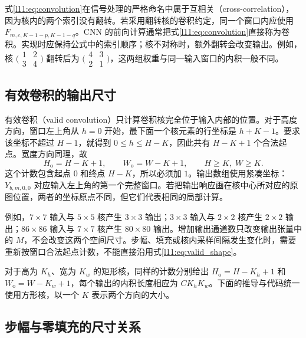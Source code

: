 式\eqref{l11:eq:convolution}在信号处理的严格命名中属于互相关（cross-correlation），因为核内的两个索引没有翻转。若采用翻转核的卷积约定，同一个窗口内应使用 $F_{m,c,K-1-p,K-1-q}$。CNN 的前向计算通常把式\eqref{l11:eq:convolution}直接称为卷积。实现时应保持公式中的索引顺序；核不对称时，额外翻转会改变输出。例如，核 $\bigl(\begin{smallmatrix}1&2\\3&4\end{smallmatrix}\bigr)$ 翻转后为 $\bigl(\begin{smallmatrix}4&3\\2&1\end{smallmatrix}\bigr)$，这两组权重与同一输入窗口的内积一般不同。

\subsection{有效卷积的输出尺寸}

有效卷积（valid convolution）只计算卷积核完全位于输入内部的位置。对于高度方向，窗口左上角从 $h=0$ 开始，最下面一个核元素的行坐标是 $h+K-1$。要求该坐标不超过 $H-1$，就得到 $0\le h\le H-K$，因此共有 $H-K+1$ 个合法起点。宽度方向同理，故
\begin{equation}
  H_{\mathrm{o}}=H-K+1,\qquad W_{\mathrm{o}}=W-K+1,
  \qquad H\ge K,\;W\ge K.
  \label{l11:eq:valid_shape}
\end{equation}
这个计数包含起点 $0$ 和终点 $H-K$，所以必须加 $1$。输出数组使用紧凑坐标：$Y_{b,m,0,0}$ 对应输入左上角的第一个完整窗口。若把输出响应画在核中心所对应的原图位置，两者的坐标原点不同，但它们代表相同的局部计算。

例如，$7\times7$ 输入与 $5\times5$ 核产生 $3\times3$ 输出；$3\times3$ 输入与 $2\times2$ 核产生 $2\times2$ 输出；$86\times86$ 输入与 $7\times7$ 核产生 $80\times80$ 输出。增加输出通道数只改变输出张量中的 $M$，不会改变这两个空间尺寸。步幅、填充或核内采样间隔发生变化时，需要重新按窗口合法起点计数，不能直接沿用式\eqref{l11:eq:valid_shape}。

对于高为 $K_h$、宽为 $K_w$ 的矩形核，同样的计数分别给出 $H_{\mathrm{o}}=H-K_h+1$ 和 $W_{\mathrm{o}}=W-K_w+1$，每个输出的内积长度相应为 $CK_hK_w$。下面的推导与代码统一使用方形核，以一个 $K$ 表示两个方向的大小。

\subsection{步幅与零填充的尺寸关系}

